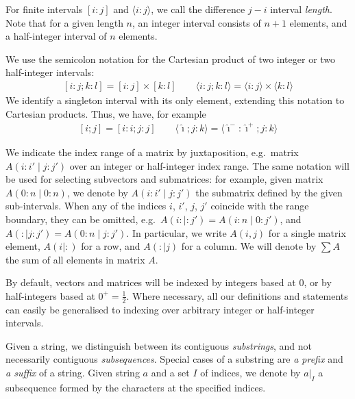 \documentclass[a4paper,UKenglish,cleveref]{lipics-v2021}
\newcommand{\tHalf}[1][1]{\tfrac{#1}{2}}
\newcommand{\A}{\hat}
\newcommand{\pa}[1]{(#1)}
\newcommand{\bra}[1]{[#1]}
\newcommand{\ang}[1]{\langle#1\rangle}
\begin{document}
For finite intervals $\bra{i:j}$ and $\ang{i:j}$,
we call the difference $j-i$ interval \emph{length}.
Note that for a given length $n$, 
an integer interval consists of $n+1$ elements,
and a half-integer interval of $n$ elements.

\index{$\pa{i_0:i_1 ; j_0:j_1}$: interval Cartesian product}%
We use the semicolon notation for the Cartesian product 
of two integer or two half-integer intervals:
%
\begin{gather*}
%
\bra{i:j ; k:l} = \bra{i:j} \times \bra{k:l}\qquad
\ang{i:j ; k:l} = \ang{i:j} \times \ang{k:l}
%
\end{gather*}
%
We identify a singleton interval with its only element, 
extending this notation to Cartesian products.
Thus, we have, for example
%
%
\begin{gather*}
%
\bra{i;j} = \bra{i:i ; j:j}\qquad
\ang{\A\imath ; j:k} = \ang{\A\imath^- : \A\imath^+ ; j:k}
%
\end{gather*}

We indicate the index range of a matrix by juxtaposition, 
e.g.\ matrix $A\pa{i:i' \mid j:j'}$ over an integer or half-integer index range.
The same notation will be used for selecting subvectors and submatrices:
for example, given matrix $A\pa{0:n \mid 0:n}$, 
we denote by $A\pa{i:i' \mid j:j'}$
the submatrix defined by the given sub-intervals.
When any of the indices $i$, $i'$, $j$, $j'$ coincide with the range boundary,
they can be omitted,
e.g.\ $A\pa{i: \mid :j'} = A\pa{i:n \mid 0:j'}$,
and $A\pa{: \mid j:j'} = A\pa{0:n \mid j:j'}$.
In particular, we write $A\pa{i,j}$ for a single matrix element,
$A\pa{i \mid :}$ for a row, and $A\pa{: \mid j}$ for a column.
We will denote by $\sum A$ the sum of all elements in matrix $A$.

By default, vectors and matrices will be indexed by integers based at $0$, 
or by half-integers based at $0^+ = \tHalf$.
Where necessary, all our definitions and statements can easily be generalised
to indexing over arbitrary integer or half-integer intervals.

Given a string, we distinguish between its contiguous \emph{substrings},
and not necessarily contiguous \emph{subsequences}.
Special cases of a substring 
are \emph{a prefix} and \emph{a suffix} of a string.
Given string $a$ and a set $I$ of indices,
we denote by $a|_I$ a subsequence formed by the characters at the specified indices.
\end{document}
